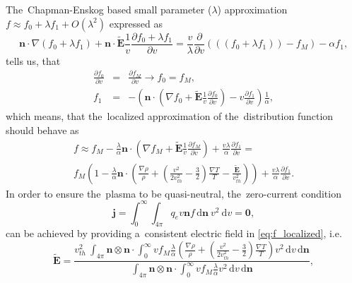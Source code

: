 \documentclass[review]{elsarticle}
\newcommand{\pdv}[2]{\frac{\partial{#1}}{\partial{#2}}}
\newcommand{\vect}[1]{\boldsymbol{#1}}
\newcommand{\dI}{\text{d}}
\newcommand{\mfp}{\lambda}
\newcommand{\vmag}{v}
\newcommand{\vth}{v_{th}}
\newcommand{\vn}{\vect{n}}
\newcommand{\tE}{\vect{\tilde{E}}}
\newcommand{\qe}{q_e}
\newcommand{\fM}{f_M}
\begin{document}
The~Chapman-Enskog based small parameter ($\mfp$) approximation 
$f\approx f_0 + \lambda f_1 + O(\lambda^2)$ expressed as
\begin{equation}
  \vn\cdot\nabla (f_0 + \mfp f_1) + 
  \vn\cdot\tE\frac{1}{\vmag}\pdv{f_0 + \mfp f_1}{\vmag}
  = \frac{\vmag}{\mfp} \pdv{}{\vmag}
  \left(\left((f_0 + \mfp f_1)\right) - \fM\right) - \alpha f_1,
  \label{eq:CE_AWBS}
\end{equation}
tells us, that
\begin{eqnarray}
  \pdv{f_0}{\vmag} &=& \pdv{\fM}{\vmag} \rightarrow f_0 = \fM , 
  \nonumber\\
  f_1 &=& - \left(\vn\cdot\left(\nabla f_0 + 
  \tE\frac{1}{\vmag}\pdv{f_0}{\vmag}\right) - \vmag \pdv{f_1}{\vmag}\right)
  \frac{1}{\alpha} ,
  \nonumber
\end{eqnarray}
which means, that the~localized approximation of the~distribution function
should behave as
\begin{multline}
  f \approx \fM 
  - \frac{\mfp}{\alpha}\vn\cdot\left(\nabla \fM + 
  \tE\frac{1}{\vmag}\pdv{\fM}{\vmag}\right) 
  + \frac{\vmag\mfp}{\alpha} \pdv{f_1}{\vmag} 
  = \\
  \fM \left(1 - \frac{\mfp}{\alpha}\vn\cdot\left(\frac{\nabla\rho}{\rho} + 
  \left( \frac{\vmag^2}{2 \vth^2} - \frac{3}{2}\right) \frac{\nabla T}{T} 
  - \frac{\tE}{\vth^2} \right) \right) 
  + \frac{\vmag\mfp}{\alpha} \pdv{f_1}{\vmag} .
  \label{eq:f_localized}
\end{multline}
In order to ensure the~plasma to be quasi-neutral, the~zero-current condition
\begin{equation}
  \vect{j} = \int_0^{\infty}\int_{4\pi} \qe \vmag \vn f 
  \, \dI\vn~\vmag^2~\dI\vmag 
  = \vect{0} ,
  \label{eq:zero_current}
\end{equation}
can be achieved by providing a~consistent electric field in 
\eqref{eq:f_localized}, i.e.
\begin{equation}
  \tE = \frac{\vth^2~\int_{4\pi} \vn\otimes\vn\cdot \int_0^{\infty} \vmag  
  \fM \frac{\mfp}{\alpha}\left(\frac{\nabla\rho}{\rho} + 
  \left( \frac{\vmag^2}{2 \vth^2} - \frac{3}{2}\right) 
  \frac{\nabla T}{T}\right)
  \vmag^2\, \dI\vmag\, \dI\vn}
  {\int_{4\pi} \vn\otimes\vn\cdot \int_0^{\infty} \vmag  
  \fM \frac{\mfp}{\alpha}\vmag^2\, \dI\vmag\, \dI\vn} ,
\end{equation}
\end{document}
